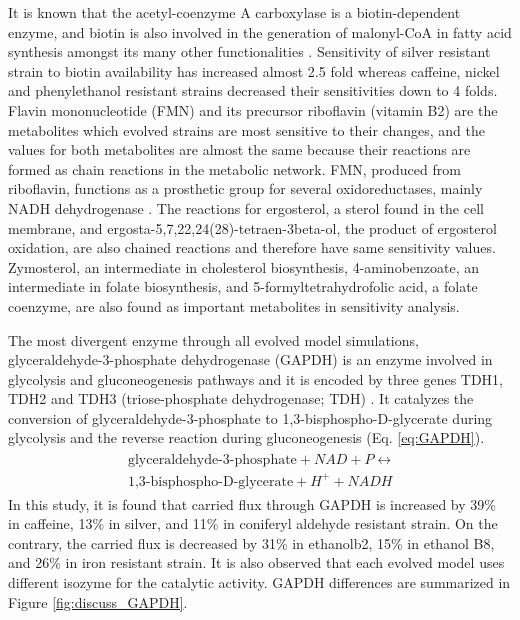 It is known that the acetyl-coenzyme A carboxylase is a biotin-dependent enzyme, and biotin is also involved in the generation of malonyl-CoA in fatty acid synthesis amongst its many other functionalities \cite{hasslacher1993acetyl, morris1987yeast}. Sensitivity of silver resistant strain to biotin availability has increased almost 2.5 fold whereas caffeine, nickel and phenylethanol resistant strains decreased their sensitivities down to 4 folds. Flavin mononucleotide (FMN) and its precursor riboflavin (vitamin B2) are the metabolites which evolved strains are most sensitive to their changes, and the values for both metabolites are almost the same because their reactions are formed as chain reactions in the metabolic network. FMN, produced from riboflavin, functions as a prosthetic group for several oxidoreductases, mainly NADH dehydrogenase \cite{tsibris1966studies}. The reactions for ergosterol, a sterol found in the cell membrane, and ergosta-5,7,22,24(28)-tetraen-3beta-ol, the product of ergosterol oxidation, are also chained reactions and therefore have same sensitivity values. Zymosterol, an intermediate in cholesterol biosynthesis, 4-aminobenzoate, an intermediate in folate biosynthesis, and 5-formyltetrahydrofolic acid, a folate coenzyme, are also found as important metabolites in sensitivity analysis.

The most divergent enzyme through all evolved model simulations, glyceraldehyde-3-phosphate dehydrogenase (GAPDH) is an enzyme involved in glycolysis and gluconeogenesis pathways and it is encoded by three genes TDH1, TDH2 and TDH3 (triose-phosphate dehydrogenase; TDH) \cite{boucherie1995differential}. It catalyzes the conversion of glyceraldehyde-3-phosphate to 1,3-bisphospho-D-glycerate during glycolysis and the reverse reaction during gluconeogenesis (Eq. \ref{eq:GAPDH}).
\begin{align}
\label{eq:GAPDH}
\begin{split}
\ \text{glyceraldehyde-3-phosphate} + NAD + P \leftrightarrow \\
\ \text{1,3-bisphospho-D-glycerate} + H^+ + NADH
\end{split}
\end{align}
In this study, it is found that carried flux through GAPDH is increased by 39\% in caffeine, 13\% in silver, and 11\% in coniferyl aldehyde resistant strain. On the contrary, the carried flux is decreased by 31\% in ethanolb2, 15\% in ethanol B8, and 26\% in iron resistant strain. It is also observed that each evolved model uses different isozyme for the catalytic activity. GAPDH differences are summarized in Figure \ref{fig:discuss_GAPDH}.

